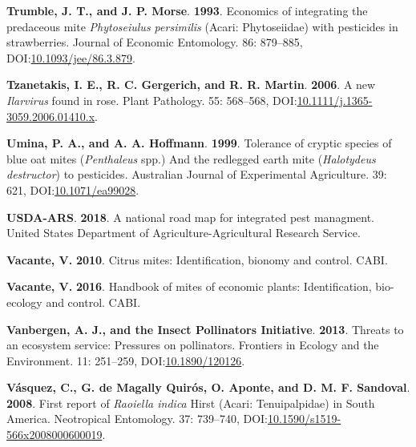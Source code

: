 \documentclass[12pt,final,CPage]{ufthesis}
\newlength{\cslhangindent}
\newenvironment{CSLReferences}[2] %
{%
	\setlength{\parindent}{0pt}
	\ifodd #1 \everypar{\setlength{\hangindent}{\cslhangindent}}\ignorespaces\fi
	\ifnum #2 > 0
	\setlength{\parskip}{#2\baselineskip}
	\fi
}%
{}
\begin{document}
{\begin{CSLReferences}{1}{0}
  \leavevmode{}%
  \textbf{Trumble, J. T., and J. P. Morse}. \textbf{1993}. Economics of integrating the predaceous mite {\emph{Phytoseiulus persimilis}} ({{Acari}: {Phytoseiidae}}) with pesticides in strawberries. Journal of Economic Entomology. 86: 879--885, DOI:\href{https://doi.org/10.1093/jee/86.3.879}{10.1093/jee/86.3.879}.

  \leavevmode{}%
  \textbf{Tzanetakis, I. E., R. C. Gergerich, and R. R. Martin}. \textbf{2006}. A new {\emph{Ilarvirus}} found in rose. Plant Pathology. 55: 568--568, DOI:\href{https://doi.org/10.1111/j.1365-3059.2006.01410.x}{10.1111/j.1365-3059.2006.01410.x}.

  \leavevmode{}%
  \textbf{Umina, P. A., and A. A. Hoffmann}. \textbf{1999}. Tolerance of cryptic species of blue oat mites ({\emph{Penthaleus}} spp.) And the redlegged earth mite ({\emph{Halotydeus destructor}}) to pesticides. Australian Journal of Experimental Agriculture. 39: 621, DOI:\href{https://doi.org/10.1071/ea99028}{10.1071/ea99028}.

  \leavevmode{}%
  \textbf{USDA-ARS}. \textbf{2018}. A national road map for integrated pest managment. {United States} Department of Agriculture-Agricultural Research Service.

  \leavevmode{}%
  \textbf{Vacante, V.} \textbf{2010}. Citrus mites: Identification, bionomy and control. CABI.

  \leavevmode{}%
  \textbf{Vacante, V.} \textbf{2016}. Handbook of mites of economic plants: Identification, bio-ecology and control. CABI.

  \leavevmode{}%
  \textbf{Vanbergen, A. J., and the Insect Pollinators Initiative}. \textbf{2013}. Threats to an ecosystem service: Pressures on pollinators. Frontiers in Ecology and the Environment. 11: 251--259, DOI:\href{https://doi.org/10.1890/120126}{10.1890/120126}.

  \leavevmode{}%
  \textbf{Vásquez, C., G. de Magally Quirós, O. Aponte, and D. M. F. Sandoval}. \textbf{2008}. First report of {\emph{Raoiella indica}} {Hirst} ({Acari}: {Tenuipalpidae}) in {South} {America}. Neotropical Entomology. 37: 739--740, DOI:\href{https://doi.org/10.1590/s1519-566x2008000600019}{10.1590/s1519-566x2008000600019}.


\end{CSLReferences}}
\end{document}
